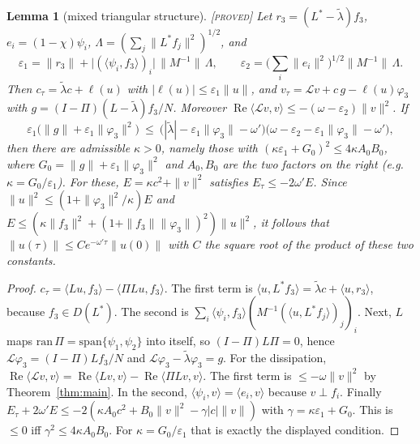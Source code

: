 \documentclass[11pt]{amsart}
\newtheorem{lemma}[theorem]{Lemma}
\theoremstyle{definition}
\theoremstyle{remark}
\newcommand{\eps}{\varepsilon}
\newcommand{\ip}[2]{\langle #1,#2\rangle}
\newcommand{\re}{\operatorname{Re}}
\newcommand{\lab}[1]{\textup{\textsc{[#1]}}}
\begin{document}
\begin{lemma}[mixed triangular structure]\label{lem:tri}\lab{proved}
Let $r_3=(L^*-\tilde\lambda)f_3$, $e_i=(1-\chi)\psi_i$, $\Lambda=(\sum_j\|L^*f_j\|^2)^{1/2}$, and
\[
\eps_1=\|r_3\|+\big|(\ip{\psi_i}{f_3})_i\big|\,\|M^{-1}\|\,\Lambda,\qquad \eps_2=\big(\textstyle\sum_i\|e_i\|^2\big)^{1/2}\|M^{-1}\|\,\Lambda .
\]
Then $c_\tau=\tilde\lambda c+\ell(u)$ with $|\ell(u)|\le\eps_1\|u\|$, and $v_\tau=\mathcal Lv+c\,g-\ell(u)\varphi_3$ with $g=(I-\Pi)(L-\tilde\lambda)f_3/N$. Moreover $\re\ip{\mathcal Lv}{v}\le-(\omega-\eps_2)\|v\|^2$. If
\[
\eps_1\big(\|g\|+\eps_1\|\varphi_3\|^2\big)\ \le\ \big(|\tilde\lambda|-\eps_1\|\varphi_3\|-\omega'\big)\big(\omega-\eps_2-\eps_1\|\varphi_3\|-\omega'\big),
\]
then there are admissible $\kappa>0$, namely those with $(\kappa\eps_1+G_0)^2\le4\kappa A_0B_0$, where $G_0=\|g\|+\eps_1\|\varphi_3\|^2$ and $A_0,B_0$ are the two factors on the right (e.g.\ $\kappa=G_0/\eps_1$). For these, $E=\kappa c^2+\|v\|^2$ satisfies $E_\tau\le-2\omega'E$. Since $\|u\|^2\le(1+\|\varphi_3\|^2/\kappa)E$ and $E\le(\kappa\|f_3\|^2+(1+\|f_3\|\|\varphi_3\|)^2)\|u\|^2$, it follows that $\|u(\tau)\|\le Ce^{-\omega'\tau}\|u(0)\|$ with $C$ the square root of the product of these two constants.
\end{lemma}
\begin{proof}
$c_\tau=\ip{Lu}{f_3}-\ip{\Pi Lu}{f_3}$. The first term is $\ip{u}{L^*f_3}=\tilde\lambda c+\ip{u}{r_3}$, because $f_3\in D(L^*)$. The second is $\sum_i\ip{\psi_i}{f_3}(M^{-1}(\ip{u}{L^*f_j})_j)_i$. Next, $L$ maps $\mathrm{ran}\,\Pi=\mathrm{span}\{\psi_1,\psi_2\}$ into itself, so $(I-\Pi)L\Pi=0$, hence $\mathcal L\varphi_3=(I-\Pi)Lf_3/N$ and $\mathcal L\varphi_3-\tilde\lambda\varphi_3=g$. For the dissipation, $\re\ip{\mathcal Lv}{v}=\re\ip{Lv}{v}-\re\ip{\Pi Lv}{v}$. The first term is $\le-\omega\|v\|^2$ by Theorem~\ref{thm:main}. In the second, $\ip{\psi_i}{v}=\ip{e_i}{v}$ because $v\perp f_i$. Finally $E_\tau+2\omega'E\le-2(\kappa A_0c^2+B_0\|v\|^2-\gamma|c|\|v\|)$ with $\gamma=\kappa\eps_1+G_0$. This is $\le0$ iff $\gamma^2\le4\kappa A_0B_0$. For $\kappa=G_0/\eps_1$ that is exactly the displayed condition.
\end{proof}
\end{document}
